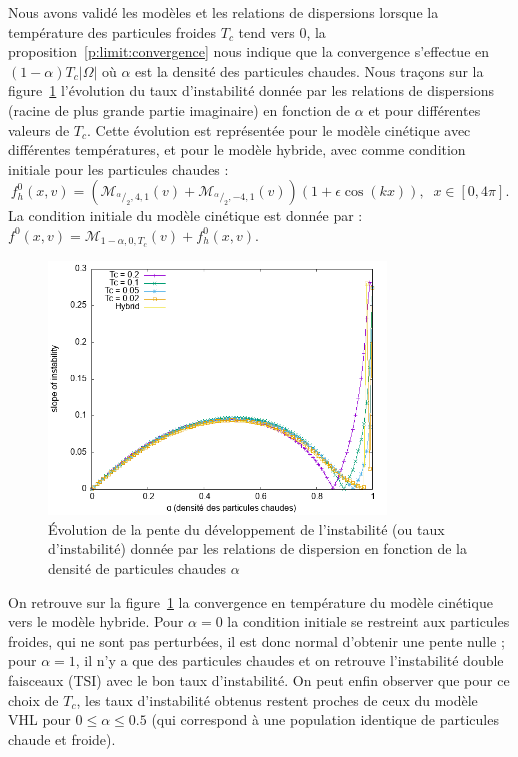 Nous avons validé les modèles et les relations de dispersions lorsque la température des particules froides $T_c$ tend vers $0$, la proposition~\ref{p:limit:convergence} nous indique que la convergence s'effectue en $(1-\alpha)T_c|\Omega|$ où $\alpha$ est la densité des particules chaudes. 
Nous traçons sur la figure~\ref{fig:limit:slope:alpha} l'évolution du taux d'instabilité donnée par les relations de dispersions (racine de plus grande partie imaginaire) en fonction de $\alpha$ et pour diff\'erentes valeurs de $T_c$. Cette évolution est représentée pour le modèle cinétique avec différentes températures, et  pour le modèle hybride, avec comme condition initiale pour les particules chaudes :
$$
  f_h^0(x,v) = \left(\mathcal{M}_{^\alpha/_2,4,1}(v) + \mathcal{M}_{^\alpha/_2,-4,1}(v)\right)(1+\epsilon\cos\left(k x\right)), \;\; x\in [0, 4\pi]. 
$$
La condition initiale du modèle cinétique est donnée par : $f^0(x,v) = \mathcal{M}_{1-\alpha,0,T_c}(v) + f_h^0(x,v)$.
\begin{figure}[h!]
  \centering
  \includegraphics[width=0.8\textwidth]{img/limit_slope_alpha.png}
  \caption{Évolution de la pente du développement de l'instabilité (ou taux d'instabilité) donnée par les relations de dispersion en fonction de la densité de particules chaudes $\alpha$}
  \label{fig:limit:slope:alpha}
\end{figure}
On retrouve sur la figure~\ref{fig:limit:slope:alpha} la convergence en température du modèle cinétique vers le modèle hybride. Pour $\alpha=0$ la condition initiale se restreint aux particules froides, qui ne sont pas perturbées, il est donc normal d'obtenir une pente nulle ; pour $\alpha=1$, il n'y a que des particules chaudes et on retrouve l'instabilité double faisceaux (TSI) avec le bon taux d'instabilité.
On peut enfin observer que pour ce choix de $T_c$, les taux d'instabilit\'e obtenus restent proches de ceux du mod\`ele VHL 
pour $0\leq \alpha \leq 0.5$ (qui correspond \`a une population identique de particules chaude et froide).




